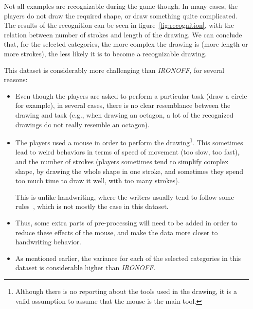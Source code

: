 \par Not all examples are recognizable during the game though. In many cases, the players do not draw the required shape, or draw something quite complicated. The results of the recognition can be seen in figure~\ref{fig:recognition}, with the relation between number of strokes and length of the drawing. We can conclude that, for the selected categories, the more complex the drawing is (more length or more strokes), the less likely it is to become a recognizable drawing.

\par This dataset is considerably more challenging than \textit{IRONOFF}, for several reasons:

\begin{itemize}
    \item Even though the players are asked to perform a particular task (draw a circle for example), in several cases, there is no clear resemblance between the drawing and task (e.g., when drawing an octagon, a lot of the recognized drawings do not really resemble an octagon).
    \item The players used a mouse in order to perform the drawing\footnote{Although there is no reporting about the tools used in the drawing, it is a valid assumption to assume that the mouse is the main tool.}. This sometimes lead to weird behaviors in terms of speed of movement (too slow, too fast), and the number of strokes (players sometimes tend to simplify complex shape, by drawing the whole shape in one stroke, and sometimes they spend too much time to draw it well, with too many strokes).

    This is unlike handwriting, where the writers usually tend to follow some rules~\citep{seraphin2019analyzing}, which is not mostly the case in this dataset.

    \item Thus, some extra parts of pre-processing will need to be added in order to reduce these effects of the mouse, and make the data more closer to handwriting behavior.

    \item As mentioned earlier, the variance for each of the selected categories in this dataset is considerable higher than \textit{IRONOFF}.
\end{itemize}

